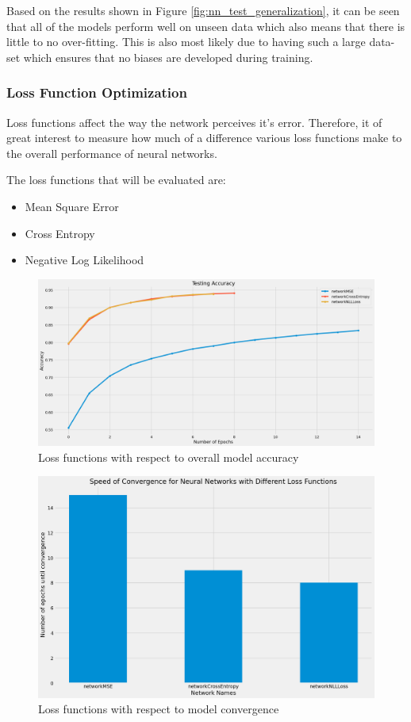 \documentclass[a4paper,twoside,10pt]{article}
\begin{document}
Based on the results shown in Figure \ref{fig:nn_test_generalization}, it can be seen that all of the models perform well on unseen data which also means that there is little to no over-fitting. This is also most likely due to having such a large data-set which ensures that no biases are developed during training.

\subsubsection{Loss Function Optimization}
Loss functions affect the way the network perceives it's error. Therefore, it of great interest to measure how much of a difference various loss functions make to the overall performance of neural networks.

The loss functions that will be evaluated are:
\begin{itemize}
    \item Mean Square Error
    \item Cross Entropy
    \item Negative Log Likelihood
\end{itemize}

\begin{figure}[H]
    \centering
    \includegraphics[scale=0.3]{Loss Functions Accuracy}
    \caption{Loss functions with respect to overall model accuracy}
    \label{fig:nn_loss_function_accuracy}
\end{figure}

\begin{figure}[H]
    \centering
    \includegraphics[scale=0.3]{Convergence Loss Functions}
    \caption{Loss functions with respect to model convergence}
    \label{fig:nn_loss_function_convergence}
\end{figure}
\end{document}
